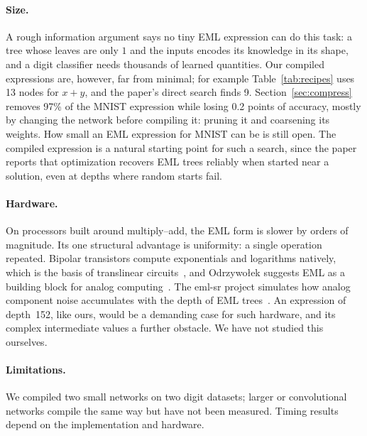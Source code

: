 \documentclass[11pt]{article}
\begin{document}
\paragraph{Size.}
A rough information argument says no tiny EML expression can do this task: a
tree whose leaves are only $1$ and the inputs encodes its knowledge in its
shape, and a digit classifier needs thousands of learned quantities. Our
compiled expressions are, however, far from minimal; for example
Table~\ref{tab:recipes} uses 13 nodes for $x+y$, and the paper's direct search
finds 9. Section~\ref{sec:compress} removes 97\% of the MNIST expression
while losing 0.2 points of accuracy, mostly by changing the network before
compiling it: pruning it and coarsening its weights. How small an EML expression for MNIST can be is still open. The compiled
expression is a natural starting point for such a search, since the paper
reports that optimization recovers EML trees reliably when started near a
solution, even at depths where random starts fail.

\paragraph{Hardware.}
On processors built around multiply--add, the EML form is slower by orders of
magnitude. Its one structural advantage is uniformity: a single operation
repeated. Bipolar transistors compute exponentials and logarithms natively,
which is the basis of translinear circuits~\cite{gilbert1975}, and
Odrzywołek suggests EML as a building block for analog
computing~\cite{odrzywolek2026}. The eml-sr project simulates how analog
component noise accumulates with the depth of EML trees~\cite{emlsr}. An expression of depth~152, like
ours, would be a demanding case for such hardware, and its complex
intermediate values a further obstacle. We have not studied this
ourselves.

\paragraph{Limitations.}
We compiled two small networks on two digit datasets; larger or
convolutional networks compile the same way but have not been measured.
Timing results depend on the implementation and hardware.

\end{document}
